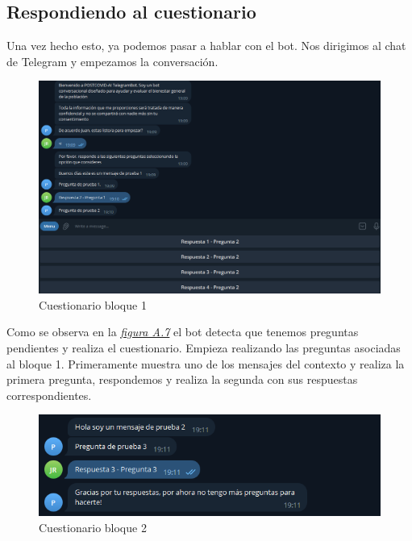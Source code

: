 \subsection{Respondiendo al cuestionario}

Una vez hecho esto, ya podemos pasar a hablar con el bot. Nos dirigimos al chat de Telegram y empezamos la conversación. 

\begin{figure}[!ht]
    \centering
    \includegraphics[width=1\textwidth]{imagenes/pregunta_prueba1_a.png}
    \caption{ Cuestionario bloque 1 }
    \label{fig:cuestionario1}
\end{figure}\vspace{0.5cm}

Como se observa en la \textit{\hyperref[fig:cuestionario1]{figura A.7}} el bot detecta que tenemos preguntas pendientes y realiza el cuestionario. Empieza realizando las preguntas asociadas al bloque 1. Primeramente muestra uno de los mensajes del contexto y realiza la primera pregunta, respondemos y realiza la segunda con sus respuestas correspondientes. 

\begin{figure}[!ht]
    \centering
    \includegraphics[width=1\textwidth]{imagenes/pregunta_prueba2_a.png}
    \caption{ Cuestionario bloque 2 }
    \label{fig:cuestionario2}
\end{figure}\vspace{0.5cm}

